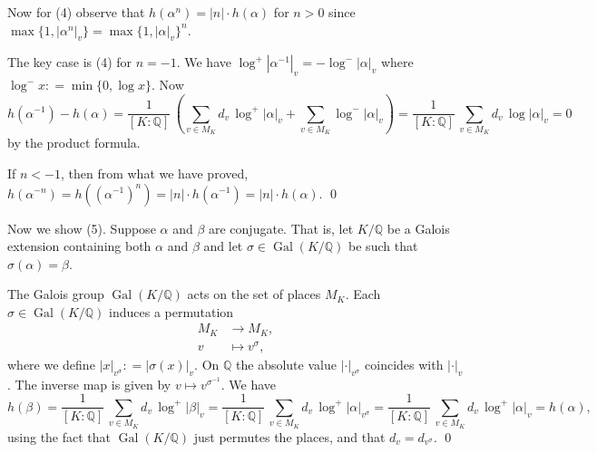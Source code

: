 \documentclass{article}
\newcommand{\dfn}{\mathrel{\mathop:}=}
\newcommand{\QQ}{\mathbb{Q}}
\DeclareMathOperator{\Gal}{Gal}
\theoremstyle{myplain}
\theoremstyle{mydefinition}
\begin{document}
\vspace{1em}

Now for (4) observe that $h (\alpha^n) = |n|\cdot h (\alpha)$ for $n > 0$ since
$\max \{ 1, |\alpha^n|_v \} = \max \{ 1, |\alpha|_v \}^n$.

The key case is (4) for $n = -1$. We have
$\log^+ |\alpha^{-1}|_v = -\log^- |\alpha|_v$ where
$\log^- x \dfn \min \{ 0, \log x \}$. Now
\[ h (\alpha^{-1}) - h (\alpha) =
  \frac{1}{[K:\QQ]} \, \left(\sum_{v\in M_K} d_v \, \log^+ |\alpha|_v + \sum_{v\in M_K} \log^- |\alpha|_v\right) =
  \frac{1}{[K:\QQ]} \, \sum_{v\in M_K} d_v \, \log |\alpha|_v = 0 \]
by the product formula.

If $n < -1$, then from what we have proved,
$h (\alpha^{-n}) = h ((\alpha^{-1})^n) = |n| \cdot h (\alpha^{-1}) = |n| \cdot h (\alpha)$. \qed

\vspace{1em}

Now we show (5). Suppose $\alpha$ and $\beta$ are conjugate. That is, let
$K/\QQ$ be a Galois extension containing both $\alpha$ and $\beta$ and let
$\sigma \in \Gal (K/\QQ)$ be such that $\sigma (\alpha) = \beta$.

The Galois group $\Gal (K/\QQ)$ acts on the set of places $M_K$. Each
$\sigma \in \Gal (K / \QQ)$ induces a permutation
\begin{align*}
  M_K & \to M_K, \\
  v & \mapsto v^\sigma,
\end{align*}
where we define $|x|_{v^\sigma} \dfn |\sigma (x)|_v$. On $\QQ$ the
absolute value $|\cdot|_{v^\sigma}$ coincides with $|\cdot|_v$. The inverse map
is given by $v \mapsto v^{\sigma^{-1}}$. We have
\[ h (\beta) = \frac{1}{[K:\QQ]} \, \sum_{v\in M_K} d_v \, \log^+ |\beta|_v =
  \frac{1}{[K:\QQ]} \, \sum_{v\in M_K} d_v \, \log^+ |\alpha|_{v^\sigma} =
  \frac{1}{[K : \QQ]} \, \sum_{v\in M_K} d_v \, \log^+ |\alpha|_v = h (\alpha), \]
using the fact that $\Gal (K / \QQ)$ just permutes the places, and that
$d_v = d_{v^\sigma}$. \qed

\vspace{1em}
\end{document}
